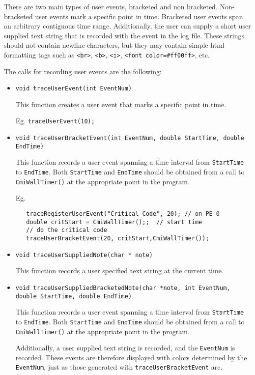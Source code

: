 There are two main types of user events, bracketed and non bracketed. Non-bracketed user events mark a specific point in time. Bracketed user events span an arbitrary contiguous time range. Additionally, the user can supply a short user supplied text string that is recorded with the event in the log file. These strings should not contain newline characters, but they may contain simple html formatting tags such as \texttt{<br>}, \texttt{<b>}, \texttt{<i>}, \texttt{<font color=\#ff00ff>}, etc.

The calls for recording user events are the following:

\begin{itemize}


\item
{\tt void traceUserEvent(int EventNum) }

This function creates a user event that marks a specific point in time.

Eg. {\tt traceUserEvent(10);}

\item
{\tt void traceUserBracketEvent(int EventNum, double StartTime, double EndTime) }

This function records a user event spanning a time interval from {\tt StartTime} to {\tt EndTime}. Both {\tt StartTime} and {\tt EndTime} should be obtained from a call to {\tt CmiWallTimer()} at the appropriate point in the program.

Eg.
\begin{verbatim}
   traceRegisterUserEvent("Critical Code", 20); // on PE 0
   double critStart = CmiWallTimer();;  // start time
   // do the critical code
   traceUserBracketEvent(20, critStart,CmiWallTimer());
\end{verbatim}

\item
{\tt void traceUserSuppliedNote(char * note) }

This function records a user specified text string at the current time.

\item
{\tt void traceUserSuppliedBracketedNote(char *note, int EventNum, double StartTime, double EndTime)}

This function records a user event spanning a time interval from {\tt StartTime} to {\tt EndTime}. Both {\tt StartTime} and {\tt EndTime} should be obtained from a call to {\tt CmiWallTimer()} at the appropriate point in the program.

Additionally, a user supplied text string is recorded, and the  {\tt EventNum} is recorded. These events are therefore displayed with colors determined by the {\tt EventNum}, just as those generated with {\tt traceUserBracketEvent} are.

\end{itemize}

